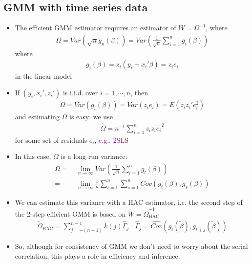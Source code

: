 \documentclass[a4paper,twoside,11pt]{article}
\begin{document}
\subsection{GMM with time series data}
\begin{itemize}
    \item The efficient GMM estimator requires an estimator of $W= \Omega^{-1}$, where
\begin{equation*}
\begin{aligned}
\Omega = Var(\sqrt{n} \bar g_n (\beta)) = Var(\frac{1}{\sqrt{n}} \sum^n_{i=1} g_i (\beta))
\end{aligned} 
\end{equation*}
where
\begin{equation*}
\begin{aligned}
g_i (\beta) = z_i (y_i - x_i' \beta)=z_i e_i
\end{aligned} 
\end{equation*}
in the linear model 
    \item If $(y_i,x_i', z_i')$ is i.i.d. over $i=1,\cdots, n$, then 
\begin{equation*}
\begin{aligned}
\Omega = Var(g_i(\beta)) = Var(z_i e_i) = E(z_i z_i' e_i^2)
\end{aligned} 
\end{equation*}
and estimating $\Omega$ is easy: we use
\begin{equation*}
\begin{aligned}
\hat{\Omega} = n^{-1} \sum^n_{i=1} z_iz_i \tilde{e_i}^2
\end{aligned} 
\end{equation*}
for some set of residuals $\tilde{e_i}$, \textcolor{Purple}{e.g., 2SLS}
    \item In this case, $\Omega$ is a long run variance:
\begin{equation*}
\begin{aligned}
\Omega =& \ \underset{n \rightarrow \infty}{\lim} Var(\frac{1}{\sqrt{n}}\sum^n_{i=1} g_t(\beta)) \\
=& \  \underset{n \rightarrow \infty}{\lim} \frac{1}{n} \sum^n_{t=1} \sum^n_{s=1} Cov(g_t(\beta), g_s(\beta))
\end{aligned} 
\end{equation*}
    \item We can estimate this variance with a HAC estimator, i.e. the second step of the 2-step efficient GMM is based on $\tilde{W} = \tilde{\Omega}_{\text{HAC}}^{-1}$
\begin{equation*}
\begin{aligned}
\tilde{\Omega}_{\text{HAC}} = \sum^{n-1}_{j=-(n-1)} k(j) \hat{\Gamma}_j \ \ \ \ \hat{\Gamma}_j = \widehat{Cov}(g_t(\tilde{\beta}), g_{t+j}(\tilde{\beta}))
\end{aligned} 
\end{equation*}
    \item So, although for consistency of GMM we don't need to worry about the serial correlation, this plays a role in efficiency and inference.
\end{itemize}
\end{document}
